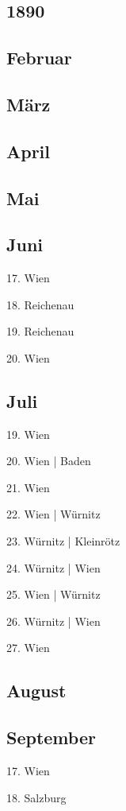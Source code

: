 \documentclass[twoside=false,titlepage=false,open=any, parskip=never, fontsize=10pt, headings=small, chapterprefix=false, appendixprefix=false, DIV=15]{scrbook}
\begin{document}
\begin{multicols}{3}
            \chapter*{1890}
            \section*{Februar}
            \section*{März}
            \section*{April}
            \section*{Mai}
            \section*{Juni}
            17. Wien\par
            18. Reichenau\par
            19. Reichenau\par
            20. Wien\par
            \section*{Juli}
            19. Wien\par
            20. Wien | Baden\par
            21. Wien\par
            22. Wien | Würnitz\par
            23. Würnitz | Kleinrötz\par
            24. Würnitz | Wien\par
            25. Wien | Würnitz\par
            26. Würnitz | Wien\par
            27. Wien\par
            \section*{August}
            \section*{September}
            17. Wien\par
            18. Salzburg\par

\end{multicols}
\end{document}
